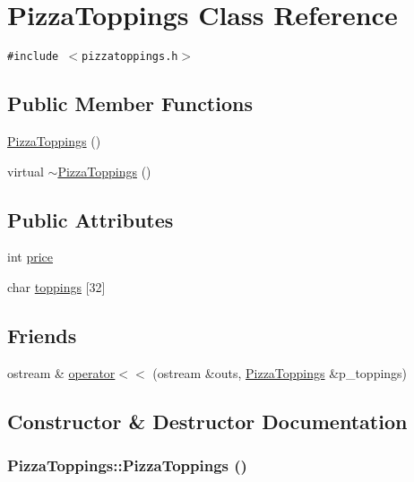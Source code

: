 \hypertarget{class_pizza_toppings}{
\section{Pizza\-Toppings Class Reference}
\label{class_pizza_toppings}
}
{\tt \#include $<$pizzatoppings.h$>$}

\subsection*{Public Member Functions}
\begin{CompactItemize}
\item 
\hyperlink{class_pizza_toppings_1461dbf4163d60233bd968c435d85db9}{Pizza\-Toppings} ()
\item 
virtual \hyperlink{class_pizza_toppings_dc812a2e2b80ffa277e3c49d7463bbfd}{$\sim$Pizza\-Toppings} ()
\end{CompactItemize}
\subsection*{Public Attributes}
\begin{CompactItemize}
\item 
int \hyperlink{class_pizza_toppings_78a5eb43deef9a7b5b9ce157b9d52ac4}{price}
\item 
char \hyperlink{class_pizza_toppings_d65a29390afb76fef45b1e9225e2b6ed}{toppings} \mbox{[}32\mbox{]}
\end{CompactItemize}
\subsection*{Friends}
\begin{CompactItemize}
\item 
ostream \& \hyperlink{class_pizza_toppings_d82a6ac0fb2196d7430f04944d9135d4}{operator$<$$<$} (ostream \&outs, \hyperlink{class_pizza_toppings}{Pizza\-Toppings} \&p\_\-toppings)
\end{CompactItemize}


\subsection{Constructor \& Destructor Documentation}
\hypertarget{class_pizza_toppings_1461dbf4163d60233bd968c435d85db9}{
\subsubsection[PizzaToppings]{\setlength{\rightskip}{0pt plus 5cm}Pizza\-Toppings::Pizza\-Toppings ()}}
\label{class_pizza_toppings_1461dbf4163d60233bd968c435d85db9}


